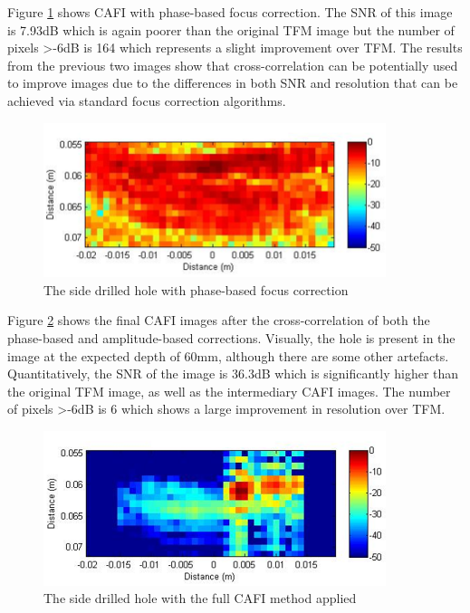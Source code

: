 Figure \ref{fig:siemens_CAFI_phase} shows CAFI with phase-based focus correction. The SNR of this image is 7.93dB which is again poorer than the original TFM image but the number of pixels \textgreater -6dB is 164 which represents a slight improvement over TFM. The results from the previous two images show that cross-correlation can be potentially used to improve images due to the differences in both SNR and resolution that can be achieved via standard focus correction algorithms.

\begin{figure}[hp]
\centering
		\includegraphics[width=100mm]{siemens_CAFI_phase.png}
		\caption{The side drilled hole with phase-based focus correction}
		\label{fig:siemens_CAFI_phase}
\end{figure}

Figure \ref{fig:siemens_CAFI_SASACI} shows the final CAFI images after the cross-correlation of both the phase-based and amplitude-based corrections. Visually, the hole is present in the image at the expected depth of 60mm, although there are some other artefacts. Quantitatively, the SNR of the image is 36.3dB which is significantly higher than the original TFM image, as well as the intermediary CAFI images. The number of pixels \textgreater -6dB is 6 which shows a large improvement in resolution over TFM.

\begin{figure}[hp]
\centering
		\includegraphics[width=100mm]{siemens_CAFI_SASACI.png}
		\caption{The side drilled hole with the full CAFI method applied}
		\label{fig:siemens_CAFI_SASACI}
\end{figure}


